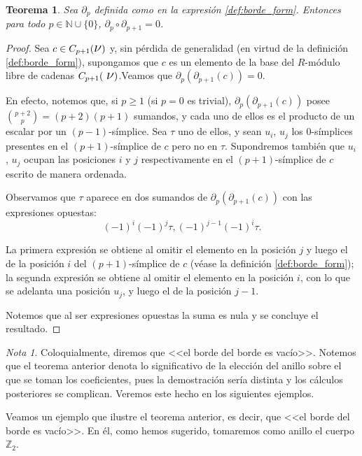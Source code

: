 \documentclass[12pt, a4paper, twoside]{book}
\numberwithin{equation}{section}
\newtheorem{theorem}{Teorema}
\theoremstyle{definition}
\theoremstyle{remark}
\newtheorem*{remark}{Nota}
\theoremstyle{plain}
\begin{document}
	\begin{theorem}
		Sea $\partial_{p}$ definida como en la expresión 
		\ref{def:borde_form}. 
		Entonces para todo $p \in \mathbb{N}\cup\{0\}$, $\partial_{p}\circ 
		\partial_{p+1}=0$.
	\end{theorem}
	\begin{proof}
		Sea $c \in C_{p+1}(\text{{\Large $\nu$}})$ y, sin pérdida
		de generalidad (en virtud de la definición 
		\ref{def:borde_form}), supongamos que $c$ es un elemento de la 
		base del $R$-módulo libre de cadenas $C_{p+1}(\text{
		{\Large $\nu$}})$.Veamos que $\partial_{p}(
		\partial_{p+1}(c))=0$.

		En efecto, notemos que, si $p\geq1$ (si $p=0$ es trivial), 
		$\partial_{p}(\partial_{p+1}(c))$ 
		posee $\binom{p+2}{p}=(p+2)(p+1)$ sumandos, y cada uno de 
		ellos es el producto de un escalar por un $(p-1)$-símplice. 
		Sea $\tau$ uno de ellos, y sean $u_{i}$, $u_{j}$ los 
		$0$-símplices presentes en el $(p+1)$-símplice de $c$ pero no 
		en $\tau$. Supondremos también que $u_{i}$, $u_{j}$ ocupan las
		posiciones $i$ y $j$ respectivamente en el $(p+1)$-símplice de
		$c$ escrito de manera ordenada.

		Observamos que $\tau$ aparece en dos sumandos de 
		$\partial_{p}(\partial_{p+1}(c))$ con las expresiones 
		opuestas:
		\begin{equation*}
			(-1)^{i}(-1)^{j}\tau, (-1)^{j-1}(-1)^{i}\tau.
		\end{equation*}

		La primera expresión se obtiene al omitir el elemento en la 
		posición $j$ y luego el de la posición $i$ del 
		$(p+1)$-símplice de $c$ (véase la definición 
		\ref{def:borde_form}); la segunda expresión se obtiene al 
		omitir el elemento en la posición $i$, con lo que se adelanta 
		una posición $u_{j}$, y luego el de la posición $j-1$.

		Notemos que al ser expresiones opuestas la suma es nula y se 
		concluye el resultado.
	\end{proof}
	
	\begin{remark}
		Coloquialmente, diremos que <<el borde del borde es vacío>>. 
		Notemos que el teorema anterior denota lo significativo de la 
		elección del anillo sobre el que se toman los coeficientes, 
		pues la demostración sería distinta y los cálculos posteriores 
		se complican. Veremos este hecho en los siguientes ejemplos.
	\end{remark}

	Veamos un ejemplo que ilustre el teorema anterior, es decir, que 
	<<el borde del borde es vacío>>. En él, como hemos sugerido, tomaremos 
	como anillo el cuerpo $\mathbb{Z}_{2}$.
\end{document}
